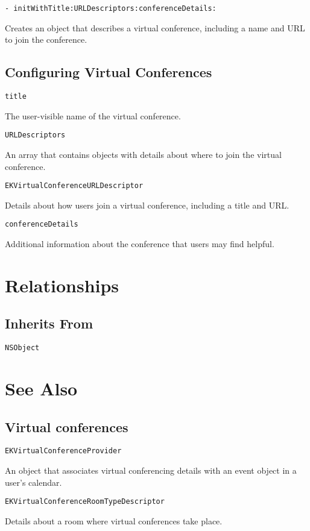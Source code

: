 \documentclass{article}
\begin{document}
\texttt{- initWithTitle:URLDescriptors:conferenceDetails:}

Creates an object that describes a virtual conference, including a name and URL to join the conference.

\subsection*{Configuring Virtual Conferences}

\texttt{title}

The user-visible name of the virtual conference.

\texttt{URLDescriptors}

An array that contains objects with details about where to join the virtual conference.

\texttt{EKVirtualConferenceURLDescriptor}

Details about how users join a virtual conference, including a title and URL.

\texttt{conferenceDetails}

Additional information about the conference that users may find helpful.

\section*{Relationships}

\subsection*{Inherits From}

\texttt{NSObject}

\section*{See Also}

\subsection*{Virtual conferences}

\texttt{EKVirtualConferenceProvider}

An object that associates virtual conferencing details with an event object in a user's calendar.

\texttt{EKVirtualConferenceRoomTypeDescriptor}

Details about a room where virtual conferences take place.

\newpage
\end{document}
